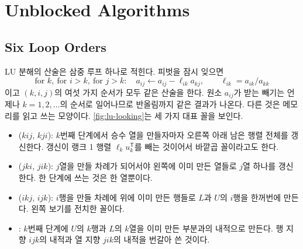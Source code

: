 \section{Unblocked Algorithms}
\label{sec:lu-unblocked}

\subsection{Six Loop Orders}

LU 분해의 산술은 삼중 루프 하나로 적힌다. 피벗을 잠시 잊으면
\[
\text{for } k,\ \text{for } i>k,\ \text{for } j>k:\quad a_{ij}\gets a_{ij}-\ell_{ik}a_{kj},\qquad \ell_{ik}=a_{ik}/a_{kk}
\]
이고 $(k,i,j)$의 여섯 가지 순서가 모두 같은 산술을 한다. 원소 $a_{ij}$가 받는 빼기는 언제나 $k=1,2,\dots$의 순서로 일어나므로 반올림까지 같은 결과가 나온다. 다른 것은 메모리를 읽고 쓰는 모양이다. \cref{fig:lu-looking}는 세 가지 대표 꼴을 보인다.
\begin{itemize}
\item {}($kij$, $kji$): $k$번째 단계에서 승수 열을 만들자마자 오른쪽 아래 남은 행렬 전체를 갱신한다. 갱신이 랭크 1 행렬 $\ell_ku_k^{\mathsf T}$를 빼는 것이어서 바깥곱 꼴이라고도 한다.
\item {}($jki$, $jik$): $j$열을 만들 차례가 되어서야 왼쪽에 이미 만든 열들로 $j$열 하나를 갱신한다. 한 단계에 쓰는 것은 한 열뿐이다.
\item {}($ikj$, $ijk$): $i$행을 만들 차례에 위에 이미 만든 행들로 $L$과 $U$의 $i$행을 한꺼번에 만든다. 왼쪽 보기를 전치한 꼴이다.
\item {}: $k$번째 단계에 $U$의 $k$행과 $L$의 $k$열을 이미 만든 부분과의 내적으로 만든다. 행 지향 $ijk$의 내적과 열 지향 $jik$의 내적을 번갈아 쓴 것이다.
\end{itemize}

